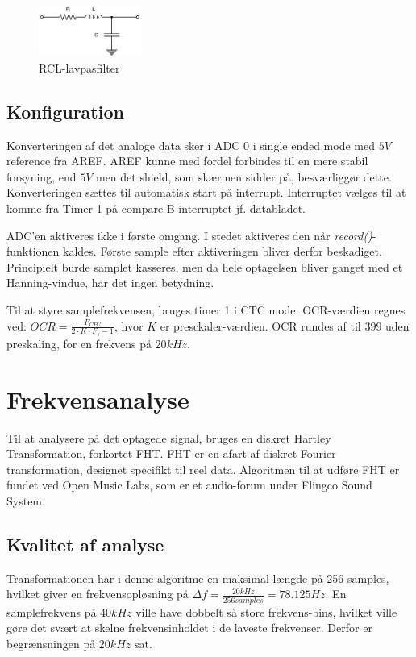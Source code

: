 \begin{figure}[H]
	\center
	\includegraphics[width=0.3\textwidth]{Figur/RCL_diagram.pdf}
	\caption{RCL-lavpasfilter}
	\label{fig:RCL}
\end{figure}

\subsection{Konfiguration}
Konverteringen af det analoge data sker i ADC 0 i single ended mode med $5 V$ reference fra AREF. 
AREF kunne med fordel forbindes til en mere stabil forsyning, end $5 V$ men det shield, som skærmen sidder på, besværliggør dette. 
Konverteringen sættes til automatisk start på interrupt. 
Interruptet vælges til at komme fra Timer 1 på compare B-interruptet jf. databladet.

ADC'en aktiveres ikke i første omgang. 
I stedet aktiveres den når \textit{record()}-funktionen kaldes. 
Første sample efter aktiveringen bliver derfor beskadiget.
Principielt burde samplet kasseres, men da hele optagelsen bliver ganget med et Hanning-vindue, har det ingen betydning. 

Til at styre samplefrekvensen, bruges timer 1 i CTC mode. 
OCR-værdien regnes ved: $ OCR = \frac{F_{CPU}}{2 \cdot K \cdot F_s - 1} $, hvor $K$ er presckaler-værdien.
OCR rundes af til $399 $ uden preskaling, for en frekvens på $20 kHz$. 

\section{Frekvensanalyse}
Til at analysere på det optagede signal, bruges en diskret Hartley Transformation, forkortet FHT. 
FHT er en afart af diskret Fourier transformation, designet specifikt til reel data. 
Algoritmen til at udføre FHT er fundet ved Open Music Labs, som er et audio-forum under Flingco Sound System. %

\subsection{Kvalitet af analyse}
Transformationen har i denne algoritme en maksimal længde på 256 samples, hvilket giver en frekvensopløsning på $ \Delta f = \frac{20 kHz}{256 samples} = 78.125 Hz$. 
En samplefrekvens på $ 40 kHz$ ville have dobbelt så store frekvens-bins, hvilket ville gøre det svært at skelne frekvensinholdet i de laveste frekvenser. 
Derfor er begrænsningen på $20 kHz $ sat. 


